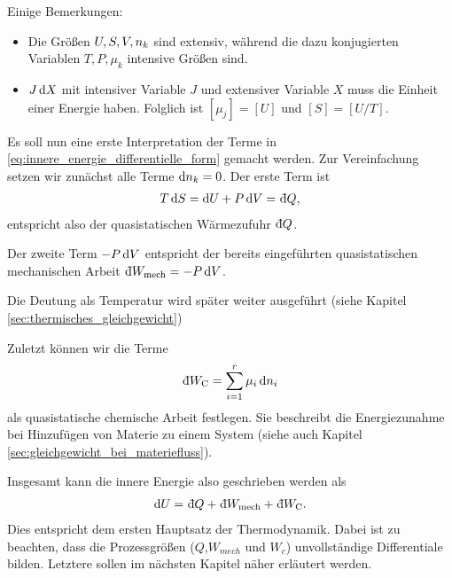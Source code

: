 Einige Bemerkungen:
\begin{itemize}
    \item Die Größen $U, S,V,n_k$ sind extensiv, während die dazu konjugierten Variablen $T,P,\mu_k$ intensive Größen sind.
    \item $J\mathop{}\!\mathrm{d} X$ mit intensiver Variable $J$ und extensiver Variable $X$ muss die Einheit einer Energie haben. Folglich ist $[\mu_j] = [U]$ und $[S]=[U/T]$.
\end{itemize}

Es soll nun eine erste Interpretation der Terme in \eqref{eq:innere_energie_differentielle_form} gemacht werden.
Zur Vereinfachung setzen wir zunächst alle Terme $\mathop{}\!\mathrm{d} n_k=0$.
Der erste Term ist
\begin{align*}
    T\diff S = \diff U+ P\diff V = \udiff Q,
\end{align*}
entspricht also der quasistatischen Wärmezufuhr $\udiff Q$.

Der zweite Term $-P\mathop{}\!\mathrm{d} V$ entspricht der bereits eingeführten quasistatischen mechanischen Arbeit $\udiff W_\mathrm{mech}=-P\diff V$.


Die Deutung als Temperatur wird später weiter ausgeführt (siehe Kapitel \ref{sec:thermisches_gleichgewicht})

Zuletzt können wir die Terme
\begin{align*}
    \udiff W_ \mathrm{C} = \sum_{i = 1}^r \mu_i\diff \sm_i
\end{align*}
als quasistatische chemische Arbeit festlegen. Sie beschreibt die Energiezunahme bei Hinzufügen von Materie zu einem System (siehe auch Kapitel \ref{sec:gleichgewicht_bei_materiefluss}).

Insgesamt kann die innere Energie also geschrieben werden als
\begin{align}
    \label{eq:erster_HS_TD}
    \diff U = \udiff Q + \udiff W_\mathrm{mech} + \udiff W_\mathrm{C}.
\end{align}
Dies entspricht dem ersten Hauptsatz der Thermodynamik.
Dabei ist zu beachten, dass die Prozessgrößen ($Q$,$W_{mech}$ und $W_c$) unvollständige Differentiale bilden. Letztere sollen im nächsten Kapitel näher erläutert werden.

